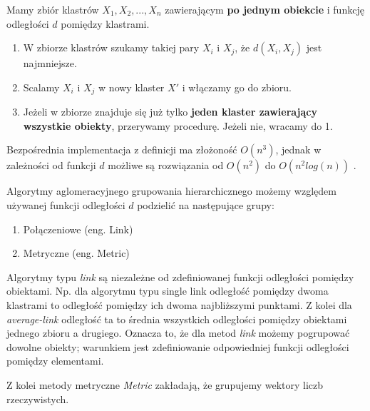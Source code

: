 \documentclass[11pt]{mgr}
\begin{document}
Mamy zbiór klastrów \(X_{1}, X_{2},...,X_{n}\) zawierającym \textbf{po jednym obiekcie} i funkcję odległości \(d\) pomiędzy klastrami.

\begin{enumerate}
\item
  W zbiorze klastrów szukamy takiej pary \(X_{i}\) i \(X_{j}\), że
  \(d(X_{i},X_{j})\) jest najmniejsze.
\item
  Scalamy \(X_{i}\) i \(X_{j}\) w nowy klaster \(X'\) i włączamy go do
  zbioru.
\item
  Jeżeli w zbiorze znajduje się już tylko \textbf{jeden klaster
  zawierający wszystkie obiekty}, przerywamy procedurę. Jeżeli nie,
  wracamy do 1.
\end{enumerate}

Bezpośrednia implementacja z definicji ma złożoność \(O(n^3)\), jednak w
zależności od funkcji \(d\) możliwe są rozwiązania od \(O(n^2)\) \cite{sibson1973slink} do
\(O(n^2log(n))\) \cite{day1984efficient}.

Algorytmy aglomeracyjnego grupowania hierarchicznego możemy względem używanej funkcji odległości \(d\) podzielić na następujące grupy:

\begin{enumerate}
\item
  Połączeniowe (eng. Link)
\item
  Metryczne (eng. Metric)
\end{enumerate}

Algorytmy typu \emph{link} są niezależne od zdefiniowanej funkcji
odległości pomiędzy obiektami. Np. dla algorytmu typu single link
odległość pomiędzy dwoma klastrami to odległość pomiędzy ich dwoma
najbliższymi punktami. Z kolei dla \emph{average-link} odległość ta to
średnia wszystkich odległości pomiędzy obiektami jednego zbioru a
drugiego. Oznacza to, że dla metod \emph{link} możemy pogrupować
dowolne obiekty; warunkiem jest zdefiniowanie odpowiedniej funkcji
odległości pomiędzy elementami.

Z kolei metody metryczne \emph{Metric} zakładają, że grupujemy
wektory liczb rzeczywistych.
\end{document}
